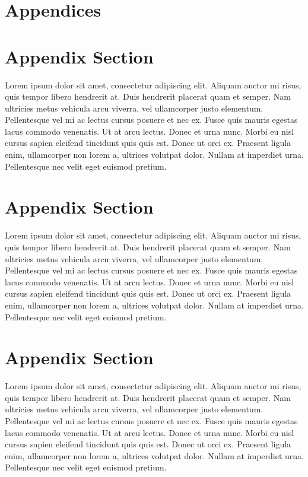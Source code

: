 \documentclass[
	a4paper, %
	12pt, %
]{persist}
\begin{document}
\section*{Appendices}

\begin{appendices}

\section{Appendix Section}

Lorem ipsum dolor sit amet, consectetur adipiscing elit. Aliquam auctor mi risus, quis tempor libero hendrerit at. Duis hendrerit placerat quam et semper. Nam ultricies metus vehicula arcu viverra, vel ullamcorper justo elementum. Pellentesque vel mi ac lectus cursus posuere et nec ex. Fusce quis mauris egestas lacus commodo venenatis. Ut at arcu lectus. Donec et urna nunc. Morbi eu nisl cursus sapien eleifend tincidunt quis quis est. Donec ut orci ex. Praesent ligula enim, ullamcorper non lorem a, ultrices volutpat dolor. Nullam at imperdiet urna. Pellentesque nec velit eget euismod pretium.

\section{Appendix Section}

Lorem ipsum dolor sit amet, consectetur adipiscing elit. Aliquam auctor mi risus, quis tempor libero hendrerit at. Duis hendrerit placerat quam et semper. Nam ultricies metus vehicula arcu viverra, vel ullamcorper justo elementum. Pellentesque vel mi ac lectus cursus posuere et nec ex. Fusce quis mauris egestas lacus commodo venenatis. Ut at arcu lectus. Donec et urna nunc. Morbi eu nisl cursus sapien eleifend tincidunt quis quis est. Donec ut orci ex. Praesent ligula enim, ullamcorper non lorem a, ultrices volutpat dolor. Nullam at imperdiet urna. Pellentesque nec velit eget euismod pretium.

\section{Appendix Section}

Lorem ipsum dolor sit amet, consectetur adipiscing elit. Aliquam auctor mi risus, quis tempor libero hendrerit at. Duis hendrerit placerat quam et semper. Nam ultricies metus vehicula arcu viverra, vel ullamcorper justo elementum. Pellentesque vel mi ac lectus cursus posuere et nec ex. Fusce quis mauris egestas lacus commodo venenatis. Ut at arcu lectus. Donec et urna nunc. Morbi eu nisl cursus sapien eleifend tincidunt quis quis est. Donec ut orci ex. Praesent ligula enim, ullamcorper non lorem a, ultrices volutpat dolor. Nullam at imperdiet urna. Pellentesque nec velit eget euismod pretium.

\end{appendices}

\end{document}
